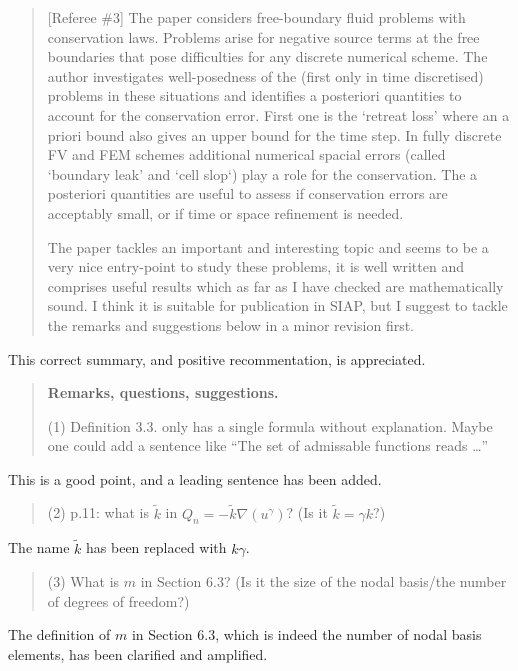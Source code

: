 \documentclass[12pt]{amsart}
\newcommand{\mm}{\medskip \noindent}
\begin{document}
\begin{quote}
[Referee \#3] The paper considers free-boundary fluid problems with conservation laws. Problems arise for negative source terms at the free boundaries that pose difficulties for any discrete numerical scheme.  The author investigates well-posedness of the (first only in time discretised) problems in these situations and identifies a posteriori quantities to account for the conservation error.  First one is the `retreat loss' where an a priori bound also gives an upper bound for the time step.  In fully discrete FV and FEM schemes additional numerical spacial errors (called `boundary leak' and
`cell slop`) play a role for the conservation.  The a posteriori quantities are useful to assess if conservation errors are acceptably small, or if time or space refinement is needed.

\mm The paper tackles an important and interesting topic and seems to be a very nice entry-point to study these problems, it is well written and comprises useful results which as far as I have checked are mathematically sound.  I think it is suitable for publication in SIAP, but I suggest to tackle the remarks and suggestions below in a minor revision first.
\end{quote}

This correct summary, and positive recommentation, is appreciated.

\begin{quote}
\textbf{Remarks, questions, suggestions.}

\mm (1) Definition 3.3. only has a single formula without explanation. Maybe one could add a sentence like ``The set of admissable functions reads \dots''
\end{quote}

This is a good point, and a leading sentence has been added.

\begin{quote}
\mm (2) p.11: what is $\tilde k$ in $Q_n = - \tilde k\nabla(u^\gamma)$?  (Is it $\tilde k = \gamma k$?)
\end{quote}

The name $\tilde k$ has been replaced with $k \gamma$.

\begin{quote}
\mm (3) What is $m$ in Section 6.3? (Is it the size of the nodal basis/the number of degrees of freedom?)
\end{quote}

The definition of $m$ in Section 6.3, which is indeed the number of nodal basis elements, has been clarified and amplified.
\end{document}
